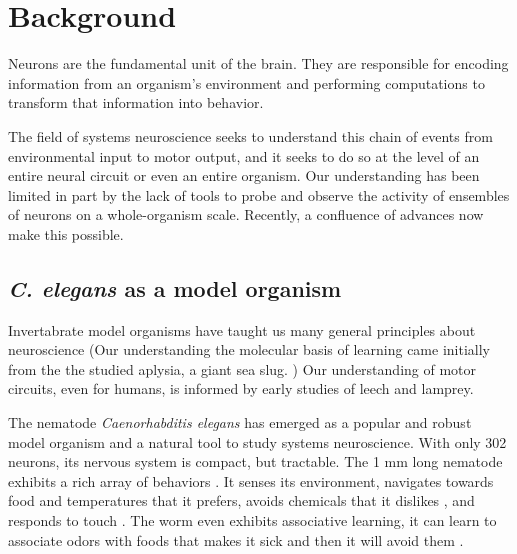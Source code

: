 
\section{Background}
Neurons are the fundamental unit of the brain.  They are responsible for encoding information from an organism's environment and performing computations to transform that information into  behavior.  



The field of systems neuroscience seeks to understand this chain of events from environmental input to motor output, and it seeks to do so at the level of an entire neural circuit or even an entire organism. Our understanding has been limited in part by the lack of tools to probe and observe the activity of ensembles of neurons on a whole-organism scale. Recently, a confluence of advances now make this possible.


\subsection{\textit{C. elegans} as a model organism}

Invertabrate model organisms have taught us many general principles about neuroscience (Our understanding the molecular basis of learning came initially from the the studied aplysia, a giant sea slug. ) Our understanding of motor circuits, even for humans, is informed by early studies of leech and lamprey. 

The nematode \textit{Caenorhabditis elegans} has emerged as a popular and robust model organism and a natural tool to study systems neuroscience. With only 302 neurons, its nervous system is compact, but tractable. The 1 mm long nematode exhibits a rich array of behaviors \citep{croll_components_1975}. It senses its environment,  navigates towards  food \cite{grewal_migration_1992}  and temperatures \cite{ryu_thermotaxis_2002} that it prefers,  avoids chemicals that it dislikes \citep{croll_behavoural_1975}, and responds to touch \citep{chalfie_neural_1985}. The worm even exhibits associative learning, it can learn to associate odors with foods that makes it sick and then it will avoid them \citep{zhang_pathogenic_2005}. 

